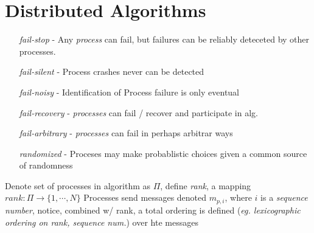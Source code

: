 \documentclass{amsart}
\numberwithin{equation}{section}
\theoremstyle{plain}
\theoremstyle{definition}
\begin{document}
\section{Distributed Algorithms}
\begin{enumerate}
  \item[\textit{fail-stop}] - Any \textit{process} can fail, but failures can be reliably deteceted by other processes.
  \item[\textit{fail-silent}] - Process crashes never can be detected
  \item[\textit{fail-noisy}] - Identification of Process failure is only eventual
  \item[\textit{fail-recovery}] - \textit{processes} can fail / recover and participate in alg.
  \item[\textit{fail-arbitrary}] - \textit{processes} can fail in perhaps arbitrar ways
  \item[\textit{randomized}] - Proceses may make probablistic choices given a common source of randomness
\end{enumerate}
Denote set of processes in algorithm as $\Pi$, define \textit{rank}, a mapping $rank: \Pi \rightarrow \{1, \cdots , N\}$
Processes send messages denoted $m_{p,i}$, where $i$ is a \textit{sequence number}, notice, combined w/ rank, a total ordering is defined (\textit{eg. lexicographic ordering on rank, sequence num.}) over hte messages
\end{document}
